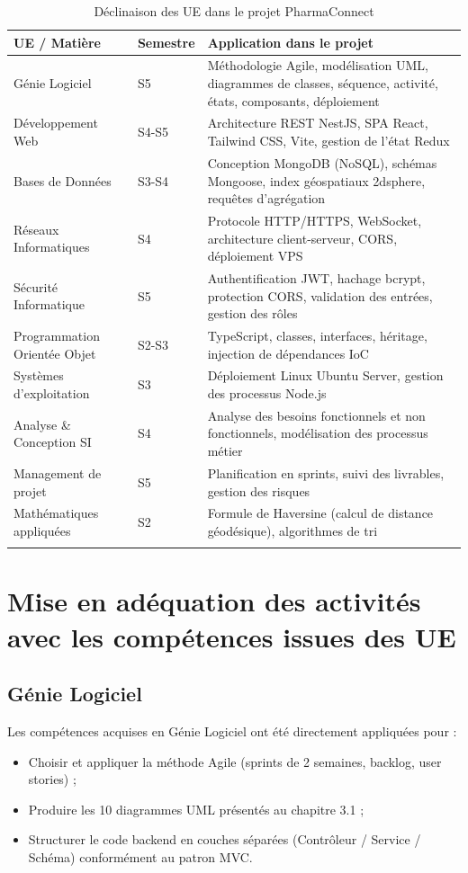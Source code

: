 \documentclass[12pt,a4paper,oneside]{report}
\begin{document}
\begin{longtable}{L{4cm}L{4cm}L{6cm}}
  \toprule
  \textbf{UE / Matière} & \textbf{Semestre} & \textbf{Application dans le projet} \\
  \midrule
  Génie Logiciel & S5 & Méthodologie Agile, modélisation UML, diagrammes de classes, séquence, activité, états, composants, déploiement \\
  Développement Web & S4-S5 & Architecture REST NestJS, SPA React, Tailwind CSS, Vite, gestion de l'état Redux \\
  Bases de Données & S3-S4 & Conception MongoDB (NoSQL), schémas Mongoose, index géospatiaux 2dsphere, requêtes d'agrégation \\
  Réseaux Informatiques & S4 & Protocole HTTP/HTTPS, WebSocket, architecture client-serveur, CORS, déploiement VPS \\
  Sécurité Informatique & S5 & Authentification JWT, hachage bcrypt, protection CORS, validation des entrées, gestion des rôles \\
  Programmation Orientée Objet & S2-S3 & TypeScript, classes, interfaces, héritage, injection de dépendances IoC \\
  Systèmes d'exploitation & S3 & Déploiement Linux Ubuntu Server, gestion des processus Node.js \\
  Analyse \& Conception SI & S4 & Analyse des besoins fonctionnels et non fonctionnels, modélisation des processus métier \\
  Management de projet & S5 & Planification en sprints, suivi des livrables, gestion des risques \\
  Mathématiques appliquées & S2 & Formule de Haversine (calcul de distance géodésique), algorithmes de tri \\
  \bottomrule
  \caption{Déclinaison des UE dans le projet PharmaConnect}
\end{longtable}

\section{Mise en adéquation des activités avec les compétences issues des UE}

\subsection{Génie Logiciel}

Les compétences acquises en Génie Logiciel ont été directement appliquées pour :
\begin{itemize}
  \item Choisir et appliquer la méthode Agile (sprints de 2 semaines, backlog, user stories) ;
  \item Produire les 10 diagrammes UML présentés au chapitre 3.1 ;
  \item Structurer le code backend en couches séparées (Contrôleur / Service / Schéma) conformément au patron MVC.
\end{itemize}
\end{document}

